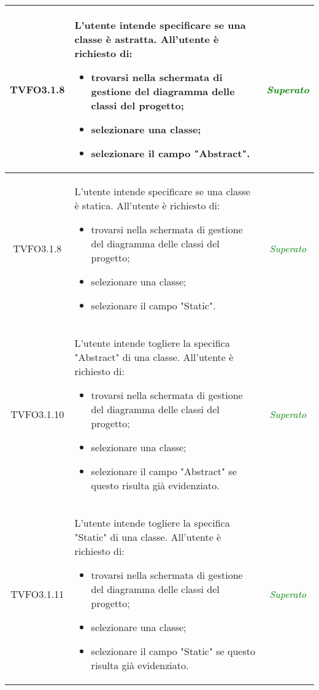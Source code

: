 \begin{longtable}{|c|>{}m{8cm}|c|}
\hypertarget{TVFO3.1.8}{TVFO3.1.8} & L'utente intende specificare se una classe è astratta.
All'utente è richiesto di:
\begin{itemize}
	\item trovarsi nella schermata di gestione del diagramma delle classi del progetto;
	\item selezionare una classe;
	\item selezionare il campo "Abstract".
\end{itemize} & \textcolor{Green}{\textit{Superato}}\\ \hline


\hypertarget{TVFO3.1.8}{TVFO3.1.8} & L'utente intende specificare se una classe è statica.
All'utente è richiesto di:
\begin{itemize}
	\item trovarsi nella schermata di gestione del diagramma delle classi del progetto;
	\item selezionare una classe;
	\item selezionare il campo "Static".
\end{itemize} & \textcolor{Green}{\textit{Superato}}\\ \hline

\hypertarget{TVFO3.1.10}{TVFO3.1.10} & L'utente intende togliere la specifica "Abstract" di una classe.
All'utente è richiesto di:
\begin{itemize}
	\item trovarsi nella schermata di gestione del diagramma delle classi del progetto;
	\item selezionare una classe;
	\item selezionare il campo "Abstract" se questo risulta già evidenziato.
\end{itemize} & \textcolor{Green}{\textit{Superato}}\\ \hline

\hypertarget{TVFO3.1.11}{TVFO3.1.11} & L'utente intende togliere la specifica "Static" di una classe.
All'utente è richiesto di:
\begin{itemize}
	\item trovarsi nella schermata di gestione del diagramma delle classi del progetto;
	\item selezionare una classe;
	\item selezionare il campo "Static" se questo risulta già evidenziato.
\end{itemize} & \textcolor{Green}{\textit{Superato}}\\ \hline


\end{longtable}
